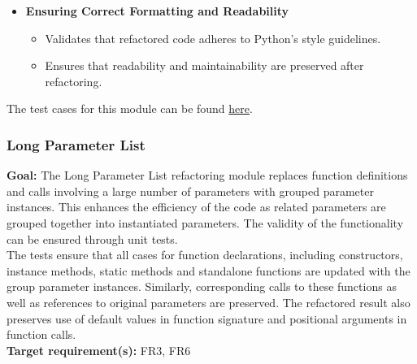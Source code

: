 \documentclass[12pt, titlepage]{article}
\begin{document}
\begin{itemize}
    \item \textbf{Ensuring Correct Formatting and Readability}
      \begin{itemize}
        \item Validates that refactored code adheres to Python’s
          style guidelines.
        \item Ensures that readability and maintainability are
          preserved after refactoring.
      \end{itemize}
  \end{itemize}

  \noindent The test cases for this module can be found
  \href{https://github.com/ssm-lab/capstone--source-code-optimizer/blob/main/tests/refactorers/test_repeated_calls.py}{here}.

  \subsubsection{Long Parameter List}

  \textbf{Goal:} The Long Parameter List refactoring module replaces
  function definitions and calls involving a large number of
  parameters with grouped parameter instances. This enhances the
  efficiency of the code as related parameters are grouped together
  into instantiated parameters. The validity of the functionality can
  be ensured through unit tests.\\

  \noindent The tests ensure that all cases for function
  declarations, including constructors, instance methods, static
  methods and standalone functions are updated with the group
  parameter instances. Similarly, corresponding calls to these
  functions as well as references to original parameters are
  preserved. The refactored result also preserves use of default
  values in function signature and positional arguments in function calls.\\

  \noindent \textbf{Target requirement(s):} FR3, FR6~\cite{SRS} \\
\end{document}

